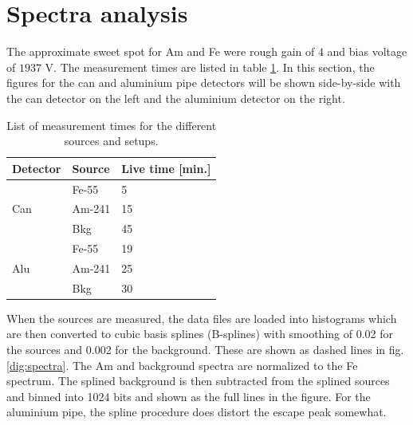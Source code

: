\section{Spectra analysis}
The approximate sweet spot for Am and Fe were rough gain of $4$ and bias voltage of $1937$ V. The measurement times are listed in table \ref{tab:measurementstimes}. In this section, the figures for the can and aluminium pipe detectors will be shown side-by-side with the can detector on the left and the aluminium detector on the right.

\begin{table}[hb!]
\begin{tabular}{lll}
\textbf{Detector}    & \textbf{Source} & \textbf{Live time {[}min.{]}} \\ \hline
\multirow{3}{*}{Can} & Fe-55           & 5                          \\
                     & Am-241          & 15                         \\
                     & Bkg             & 45                         \\ \hline
\multirow{3}{*}{Alu} & Fe-55           & 19                         \\
                     & Am-241          & 25                         \\
                     & Bkg             & 30                         \\ \hline
\end{tabular}
\caption{List of measurement times for the different sources and setups.}
\label{tab:measurementstimes}
\end{table}

When the sources are measured, the data files are loaded into histograms which are then converted to cubic basis splines (B-splines) with smoothing of 0.02 for the sources and 0.002 for the background. These are shown as dashed lines in fig. \ref{dig:spectra}. The Am and background spectra are normalized to the Fe spectrum. The splined background is then subtracted from the splined sources and binned into 1024 bits and shown as the full lines in the figure. For the aluminium pipe, the spline procedure does distort the escape peak somewhat.

